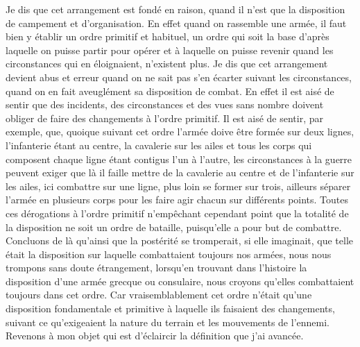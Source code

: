 \documentclass[french,twoside]{book} %
\begin{document}
Je dis que cet arrangement est fondé en raison, quand il n’est que la disposition de campement et d’organisation. En effet quand on rassemble une armée, il faut bien y établir un ordre primitif et habituel, un ordre qui soit la base d’après laquelle on puisse partir pour opérer et à laquelle on puisse revenir quand les circonstances qui en éloignaient, n’existent plus. Je dis que cet arrangement devient abus et erreur quand on ne sait pas s’en écarter suivant les circonstances, quand on en fait aveuglément sa disposition de combat. En effet il est aisé de sentir que des incidents, des circonstances et des vues sans nombre doivent obliger de faire des changements à l’ordre primitif. Il est aisé de sentir, par exemple, que, quoique suivant cet ordre l’armée doive être formée sur deux lignes, l’infanterie étant au centre, la cavalerie sur les ailes et tous les corps qui composent chaque ligne étant contigus l’un à l’autre, les circonstances à la guerre peuvent exiger que là il faille mettre de la cavalerie au centre et de l’infanterie sur les ailes, ici combattre sur une ligne, plus loin se former sur trois, ailleurs séparer l’armée en plusieurs corps pour les faire agir chacun sur différents points. Toutes ces dérogations à l’ordre primitif n’empêchant cependant point que la totalité de la disposition ne soit un ordre de bataille, puisqu’elle a pour but de combattre. Concluons de là qu’ainsi que la postérité se tromperait, si elle imaginait, que telle était la disposition sur laquelle combattaient toujours nos armées, nous nous trompons sans doute étrangement, lorsqu’en trouvant dans l’histoire la disposition d’une armée grecque ou consulaire, nous croyons qu’elles combattaient toujours dans cet ordre. Car vraisemblablement cet ordre n’était qu’une disposition fondamentale et primitive à laquelle ils faisaient des changements, suivant ce qu’exigeaient la nature du terrain et les mouvements de l’ennemi. Revenons à mon objet qui est d’éclaircir la définition que j’ai avancée.\par
\end{document}
